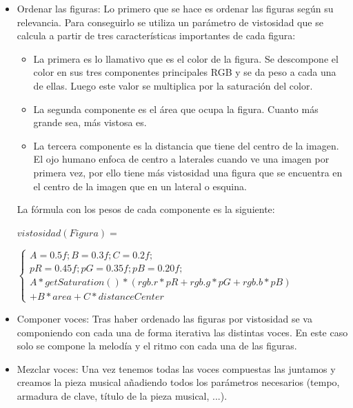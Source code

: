 \begin{itemize}
	\item Ordenar las figuras: Lo primero que se hace es ordenar las figuras según su relevancia. Para conseguirlo se utiliza un parámetro de vistosidad que se calcula a partir de tres características importantes de cada figura:
	\begin{itemize}
		\item La primera es lo llamativo que es el color de la figura. Se descompone el color en sus tres componentes principales RGB y se da peso a cada una de ellas. Luego este valor se multiplica por la saturación del color.
		\item La segunda componente es el área que ocupa la figura. Cuanto más grande sea, más vistosa es.
		\item La tercera componente es la distancia que tiene del centro de la imagen. El ojo humano enfoca de centro a laterales cuando ve una imagen por primera vez, por ello tiene más vistosidad una figura que se encuentra en el centro de la imagen que en un lateral o esquina.
	\end{itemize}
	
	La fórmula con los pesos de cada componente es la siguiente:
	\begin{center}
		$vistosidad(Figura) =$
	\end{center}
	\begin{center}
		
		$\left\{
		\begin{array}{cc}
		A = 0.5f; B = 0.3f; C = 0.2f;\\ 
		pR = 0.45f; pG = 0.35f; pB = 0.20f;\\
		A*getSaturation()*(rgb.r*pR + rgb.g*pG + rgb.b*pB)\\
		 + B*area + C*distanceCenter
		\end{array}\right.$
	\end{center}

	\item Componer voces: Tras haber ordenado las figuras por vistosidad se va componiendo con cada una de forma iterativa las distintas voces. En este caso solo se compone la melodía y el ritmo con cada una de las figuras.

	\item Mezclar voces: Una vez tenemos todas las voces compuestas las juntamos y creamos la pieza musical añadiendo todos los parámetros necesarios (tempo, armadura de clave, título de la pieza musical, ...).

\end{itemize}

